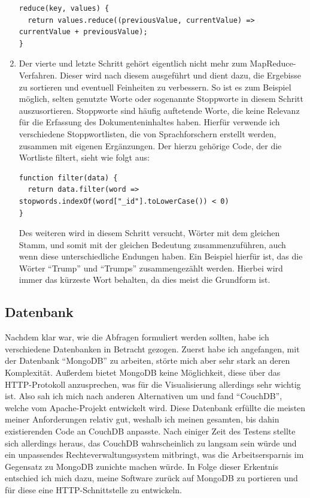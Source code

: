 \documentclass[12pt,ngerman,a4paperpaper,]{paper}
\begin{document}
\begin{enumerate}
\begin{lstlisting}
reduce(key, values) {
  return values.reduce((previousValue, currentValue) => currentValue + previousValue);
}
\end{lstlisting}
\item
  Der vierte und letzte Schritt gehört eigentlich nicht mehr zum
  MapReduce-Verfahren. Dieser wird nach diesem ausgeführt und dient
  dazu, die Ergebisse zu sortieren und eventuell Feinheiten zu
  verbessern. So ist es zum Beispiel möglich, selten genutzte Worte oder
  sogenannte Stoppworte in diesem Schritt auszusortieren. Stoppworte
  sind häufig auftetende Worte, die keine Relevanz für die Erfassung des
  Dokumenteninhaltes haben. Hierfür verwende ich verschiedene
  Stoppwortlisten, die von Sprachforschern erstellt werden, zusammen mit
  eigenen Ergänzungen. Der hierzu gehörige Code, der die Wortliste
  filtert, sieht wie folgt aus:

\begin{lstlisting}
function filter(data) {
  return data.filter(word => stopwords.indexOf(word["_id"].toLowerCase()) < 0)
}
\end{lstlisting}

  Des weiteren wird in diesem Schritt versucht, Wörter mit dem gleichen
  Stamm, und somit mit der gleichen Bedeutung zusammenzuführen, auch
  wenn diese unterschiedliche Endungen haben. Ein Beispiel hierfür ist,
  das die Wörter ``Trump'' und ``Trumps'' zusammengezählt werden.
  Hierbei wird immer das kürzeste Wort behalten, da dies meist die
  Grundform ist.
\end{enumerate}

\subsection{Datenbank}\label{datenbank}

Nachdem klar war, wie die Abfragen formuliert werden sollten, habe ich
verschiedene Datenbanken in Betracht gezogen. Zuerst habe ich
angefangen, mit der Datenbank ``MongoDB'' zu arbeiten, störte mich aber
sehr stark an deren Komplexität. Außerdem bietet MongoDB keine
Möglichkeit, diese über das HTTP-Protokoll anzusprechen, was für die
Visualisierung allerdings sehr wichtig ist. Also sah ich mich nach
anderen Alternativen um und fand ``CouchDB'', welche vom Apache-Projekt
entwickelt wird. Diese Datenbank erfüllte die meisten meiner
Anforderungen relativ gut, weshalb ich meinen gesamten, bis dahin
existierenden Code an CouchDB anpasste. Nach einiger Zeit des Testens
stellte sich allerdings heraus, das CouchDB wahrscheinlich zu langsam
sein würde und ein unpassendes Rechteverwaltungssystem mitbringt, was
die Arbeitsersparnis im Gegensatz zu MongoDB zunichte machen würde. In
Folge dieser Erkentnis entschied ich mich dazu, meine Software zurück
auf MongoDB zu portieren und für diese eine HTTP-Schnittstelle zu
entwickeln.
\end{document}
